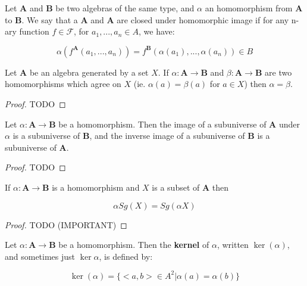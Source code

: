 \begin{definition}
	Let $\boldsymbol{A}$ and $\boldsymbol{B}$ be two algebras of the same type, and $\alpha$ an homomorphism from $\boldsymbol{A}$ to $\boldsymbol{B}$. We say that a $\boldsymbol{A}$ and $\boldsymbol{A}$ are closed under homomorphic image if for any n-ary function $f \in \mathcal{F}$, for $a_1,...,a_n \in A$, we have:

	\begin{equation}
	\alpha (f^{\boldsymbol{A}}(a_1,...,a_n)) = f^{\boldsymbol{B}}(\alpha(a_1),...,\alpha(a_n)) \in B
	\end{equation}
\end{definition}

\begin{theorem}
	Let $\boldsymbol{A}$ be an algebra generated by a set $X$. If $\alpha: \boldsymbol{A} \rightarrow \boldsymbol{B}$ and $\beta: \boldsymbol{A} \rightarrow \boldsymbol{B}$ are two homomorphisms which agree on $X$ (ie. $\alpha(a) = \beta(a)$ for $a \in X$) then $\alpha = \beta$.
\end{theorem}

\begin{proof}
	TODO
\end{proof}

\begin{theorem}
	Let $\alpha: \boldsymbol{A} \rightarrow \boldsymbol{B}$ be a homomorphism. Then the image of a subuniverse of $\boldsymbol{A}$ under $\alpha$ is a subuniverse of $\boldsymbol{B}$, and the inverse image of a subuniverse of $\boldsymbol{B}$ is a subuniverse of $\boldsymbol{A}$.
\end{theorem}

\begin{proof}
	TODO
\end{proof}

\begin{theorem}
	If $\alpha: \boldsymbol{A} \rightarrow \boldsymbol{B}$ is a homomorphism and $X$ is a subset of $\boldsymbol{A}$ then

	\begin{equation}
		\alpha Sg(X) = Sg(\alpha X)
	\end{equation}
\end{theorem}

\begin{proof}
	TODO (IMPORTANT)
\end{proof}

\begin{definition}
	Let $\alpha: \boldsymbol{A} \rightarrow \boldsymbol{B}$ be a homomorphism. Then the \textbf{kernel} of $\alpha$, written $\ker (\alpha)$, and sometimes just $\ker \alpha$, is defined by:

	\begin{equation}
		\ker (\alpha) = \{ <a,b> \in A^2 | \alpha(a) = \alpha(b) \}
	\end{equation}
\end{definition}

